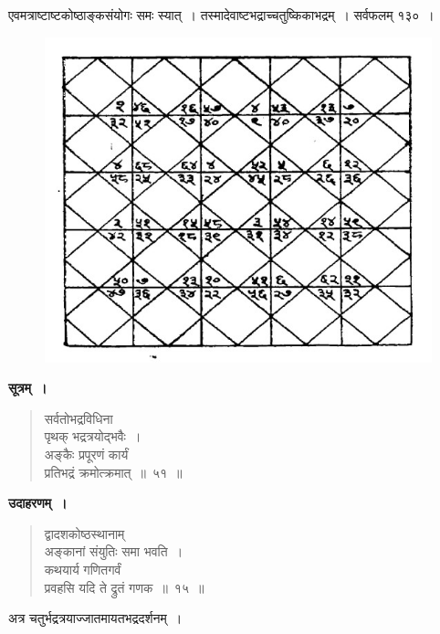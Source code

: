 \documentclass[11pt, openany]{book}
\begin{document}
एवमत्राष्टाष्टकोष्ठाङ्कसंयोगः समः स्यात्~। तस्मादेवाष्टभद्राच्चतुष्किकाभद्रम्~। सर्वफलम् १३०~।

\newpage

\begin{figure}[h!]
    \centering
    \includegraphics[scale=0.4]{graphics/417.jpg}
    
\end{figure}

\textbf{सूत्रम्~।}

\begin{quote}
{\gk सर्वतोभद्रविधिना\\
पृथक् भद्रत्रयोद्भवैः~।\\
अङ्कैः प्रपूरणं कार्यं\\
प्रतिभद्रं क्रमोत्क्रमात्~॥~५१~॥}	
\end{quote}

\textbf{उदाहरणम्~।}

\begin{quote}
{\ex द्वादशकोष्ठस्थानाम्\\
अङ्कानां संयुतिः समा भवति~।\\
कथयार्य गणितगर्वं\\
प्रवहसि यदि ते द्रुतं गणक~॥~१५~॥}
\end{quote}

\newpage

अत्र चतुर्भद्रत्रयाज्जातमायतभद्रदर्शनम्~।
\end{document}
